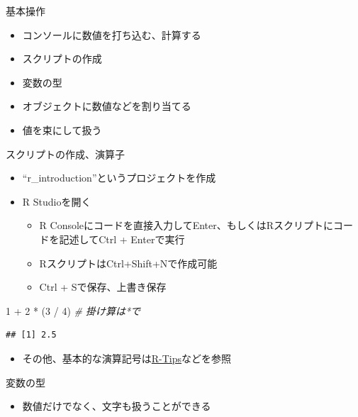\documentclass[
  ignorenonframetext,
]{beamer}
\newenvironment{Shaded}{\begin{snugshade}}{\end{snugshade}}
\newcommand{\CommentTok}[1]{\textcolor[rgb]{0.56,0.35,0.01}{\textit{#1}}}
\newcommand{\DecValTok}[1]{\textcolor[rgb]{0.00,0.00,0.81}{#1}}
\newcommand{\NormalTok}[1]{#1}
\newcommand{\SpecialCharTok}[1]{\textcolor[rgb]{0.00,0.00,0.00}{#1}}
\providecommand{\tightlist}{%
  \setlength{\itemsep}{0pt}\setlength{\parskip}{0pt}}
\begin{document}
\begin{frame}[fragile]{基本操作}
\protect\hypertarget{ux57faux672cux64cdux4f5c}{}
\begin{itemize}
\tightlist
\item
  コンソールに数値を打ち込む、計算する
\item
  スクリプトの作成
\item
  変数の型
\item
  オブジェクトに数値などを割り当てる
\item
  値を束にして扱う
\end{itemize}

\begin{block}{スクリプトの作成、演算子}
\protect\hypertarget{ux30b9ux30afux30eaux30d7ux30c8ux306eux4f5cux6210ux6f14ux7b97ux5b50}{}
\begin{itemize}
\item
  ``r\_introduction''というプロジェクトを作成
\item
  R Studioを開く

  \begin{itemize}
  \tightlist
  \item
    R
    Consoleにコードを直接入力してEnter、もしくはRスクリプトにコードを記述してCtrl
    + Enterで実行
  \item
    RスクリプトはCtrl+Shift+Nで作成可能
  \item
    Ctrl + Sで保存、上書き保存
  \end{itemize}
\end{itemize}

\begin{Shaded}
\begin{Highlighting}[]
\DecValTok{1} \SpecialCharTok{+} \DecValTok{2} \SpecialCharTok{*}\NormalTok{ (}\DecValTok{3} \SpecialCharTok{/} \DecValTok{4}\NormalTok{) }\CommentTok{\# 掛け算は*で}
\end{Highlighting}
\end{Shaded}

\begin{verbatim}
## [1] 2.5
\end{verbatim}

\begin{itemize}
\tightlist
\item
  その他、基本的な演算記号は\href{http://cse.naro.affrc.go.jp/takezawa/r-tips/r.html}{R-Tips}などを参照
\end{itemize}
\end{block}

\begin{block}{変数の型}
\protect\hypertarget{ux5909ux6570ux306eux578b}{}
\begin{itemize}
\tightlist
\item
  数値だけでなく、文字も扱うことができる


\end{itemize}
\end{block}
\end{frame}
\end{document}
